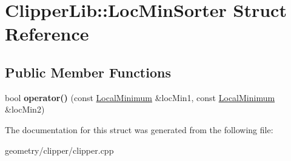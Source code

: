 \hypertarget{struct_clipper_lib_1_1_loc_min_sorter}{}\section{Clipper\+Lib\+:\+:Loc\+Min\+Sorter Struct Reference}
\label{struct_clipper_lib_1_1_loc_min_sorter}
\subsection*{Public Member Functions}
\begin{DoxyCompactItemize}
\item 
\mbox{\label{struct_clipper_lib_1_1_loc_min_sorter_a4e5cd20cdd73b95700e91e61a8de5c06}} 
bool {\bfseries operator()} (const \mbox{\hyperlink{struct_clipper_lib_1_1_local_minimum}{Local\+Minimum}} \&loc\+Min1, const \mbox{\hyperlink{struct_clipper_lib_1_1_local_minimum}{Local\+Minimum}} \&loc\+Min2)
\end{DoxyCompactItemize}


The documentation for this struct was generated from the following file\+:\begin{DoxyCompactItemize}
\item 
geometry/clipper/clipper.\+cpp\end{DoxyCompactItemize}
